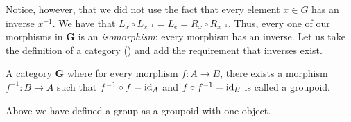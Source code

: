 \documentclass{article}
\begin{document}
Notice, however, that we did not use the fact that every element $x \in G$ has an inverse $x^{-1}$.
We have that $L_{x} \circ L_{x^{-1}} = L_{e} = R_{x} \circ R_{x^{-1}}$.
Thus, every one of our morphisms in $\textbf{G}$ is an \emph{isomorphism}: every morphism has an inverse.
Let us take the definition of a category () and add the requirement that inverses exist.
\begin{defn}\label{defn:groupoid}
  A category $\textbf{G}$ where for every morphism $f\colon A \to B$, there exists a morphism $f^{-1}\colon B \to A$ such that $f^{-1} \circ f = \operatorname{id}_{A}$ and $f \circ f^{-1} = \operatorname{id}_{B}$ is called a groupoid.
\end{defn}
Above we have defined a group as a groupoid with one object.
\end{document}
